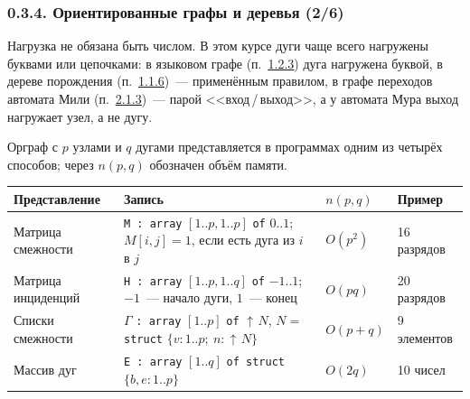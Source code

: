 \documentclass[mathserif,12pt,aspectratio=169]{beamer}
\def\Pointer{\operatorname{\uparrow\!}}
\def\DMref#1#2{{\color{blue}\underline{\hyperlink{#2}{#1}}}}
\begin{document}
\begin{frame}
\frametitle{0.3.4. Ориентированные графы и деревья (2/6)}

\begin{remark}
Нагрузка не обязана быть числом. В этом курсе дуги чаще всего нагружены буквами
или цепочками: в языковом графе (п.~\DMref{1.2.3}{1.2.3.}) дуга нагружена буквой,
в дереве порождения (п.~\DMref{1.1.6}{1.1.6.})~--- применённым правилом, в графе
переходов автомата Мили (п.~\DMref{2.1.3}{2.1.3.})~--- парой <<вход\,/\,выход>>, а
у автомата Мура выход нагружает узел, а не дугу.
\end{remark}
\vspace{-4pt}

Орграф с $p$ узлами и $q$ дугами представляется в программах одним из четырёх
способов; через $n(p,q)$ обозначен объём памяти.

\vspace{-2pt}
\begin{center}\scriptsize
\begin{tabular}{|l|p{6.6cm}|l|l|}
\hline
Представление & Запись & $n(p,q)$ & Пример \\
\hline
Матрица смежности & \texttt{M : array} $[1..p,1..p]$ \texttt{of} $0..1$;
$M[i,j]=1$, если есть дуга из $i$ в $j$ & $O(p^2)$ & 16 разрядов \\
Матрица инциденций & \texttt{H : array} $[1..p,1..q]$ \texttt{of} $-1..1$;
$-1$~--- начало дуги, $1$~--- конец & $O(pq)$ & 20 разрядов \\
Списки смежности & $\Gamma$ \texttt{: array} $[1..p]$ \texttt{of} $\Pointer N$,
$N=$ \texttt{struct} $\{v:1..p;\ n:\Pointer N\}$ & $O(p+q)$ & 9 элементов \\
Массив дуг & \texttt{E : array} $[1..q]$ \texttt{of struct} $\{b,e:1..p\}$ &
$O(2q)$ & 10 чисел \\
\hline
\end{tabular}
\end{center}

\end{frame}
\end{document}
